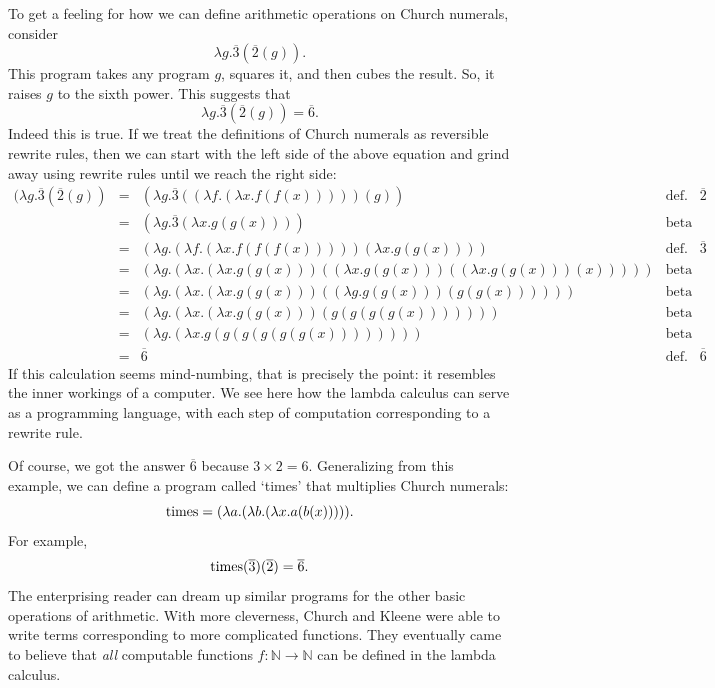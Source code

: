 \documentclass[12pt,twoside,openright]{report}
\newcommand{\NN}{\mathbb{N}}
\newcommand{\maps}{\colon}
\newcommand{\Times}{{\rm times}}
\begin{document}
To get a feeling for how we can define arithmetic operations on Church numerals, consider
\[          \lambda g . \overline{3}(\overline{2}(g))  . \]
This program takes any program $g$, squares it, and then cubes the result. So, it raises $g$ to the sixth power.  This suggests that
\[       \lambda g . \overline{3}(\overline{2}(g)) = \overline{6} . \]
Indeed this is true.  If we treat the definitions of Church numerals as reversible rewrite rules, then we can start with the left side of the above equation and grind away using rewrite rules until we reach the right side:
\[
\begin{array}{ccll}
 (\lambda g . \overline{3} (\overline{2} (g))
 &=& (\lambda g . \overline{3} ((\lambda f . (\lambda x . f(f(x))))) (g)) 
  & \textrm{def.\ of } \overline{2} \\
 &=& (\lambda g . \overline{3} (\lambda x . g(g(x))))  
  & \textrm{beta} \\
 &=& (\lambda g . (\lambda f . (\lambda x . f(f(f(x))))) 
     (\lambda x . g(g(x)))) 
  & \textrm{def.\ of } \overline{3} \\
 &=& (\lambda g . (\lambda x . (\lambda x . g(g(x)))
     ((\lambda x . g(g(x))) ((\lambda x . g(g(x))) (x))))) 
  & \textrm{beta} \\
 &=& (\lambda g . (\lambda x . (\lambda x. g(g(x)))
     ((\lambda g . g(g(x))) (g(g(x))))))
  & \textrm{beta} \\
 &=& (\lambda g . (\lambda x . (\lambda x . g(g(x))) (g(g(g(g(x))))))) 
  & \textrm{beta} \\
 &=& (\lambda g . (\lambda x . g(g(g(g(g(g(x))))))))  
  & \textrm{beta} \\
 &=& \overline{6} 
   & \textrm{def.\ of } \overline{6} 
\end{array}
\]
If this calculation seems mind-numbing, that is precisely the point:
it resembles the inner workings of a computer.  We see here how the lambda calculus can serve as a programming language, with each step of computation corresponding to a rewrite rule.

Of course, we got the answer $\overline{6}$ because $3 \times 2 = 6$. Generalizing from this example, we can define a program called `times' that multiplies Church numerals:
\[    \Times = (\lambda a . (\lambda b . (\lambda x . a(b(x))))) .\]
For example, 
\[
\Times(\overline{3})(\overline{2}) = \overline{6} .
\]
The enterprising reader can dream up similar programs for the other basic operations of arithmetic.  With more cleverness, Church and Kleene were able to write terms corresponding to more complicated functions.  They eventually came to believe that {\it all} computable functions $f \maps \NN \to \NN$ can be defined in the lambda calculus.
\end{document}
